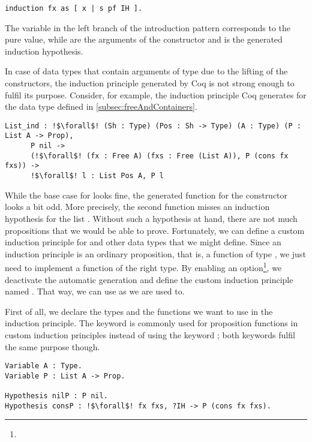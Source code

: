 \begin{verbatim}
induction fx as [ x | s pf IH ].
\end{verbatim}

The variable  in the left branch of the introduction pattern corresponds to the pure value, while   are the arguments of the  constructor and  is the generated induction hypothesis.

In case of data types that contain arguments of type  due to the lifting of the constructors, the induction principle generated by Coq is not strong enough to fulfil its purpose.
Consider, for example, the induction principle Coq generates for the  data type defined in \autoref{subsec:freeAndContainers}.

\begin{verbatim}
List_ind : !$\forall$! (Sh : Type) (Pos : Sh -> Type) (A : Type) (P : List A -> Prop),
      P nil ->
      (!$\forall$! (fx : Free A) (fxs : Free (List A)), P (cons fx fxs)) ->
      !$\forall$! l : List Pos A, P l
\end{verbatim}

While the base case for  looks fine, the generated function for the  constructor looks a bit odd.
More precisely, the second function misses an induction hypothesis for the list .
Without such a hypothesis at hand, there are not much propositions that we would be able to prove.
Fortunately, we can define a custom induction principle for  and other data types that we might define.
Since an induction principle is an ordinary proposition, that is, a function of type , we just need to implement a function of the right type.
By enabling an option\footnote{}, we deactivate the automatic generation and define the custom induction principle named .
That way, we can use  as we are used to.

First of all, we declare the types and the functions we want to use in the induction principle.
The keyword  is commonly used for proposition functions in custom induction principles instead of using the keyword ; both keywords fulfil the same purpose though.

\begin{verbatim}
Variable A : Type.
Variable P : List A -> Prop.

Hypothesis nilP : P nil.
Hypothesis consP : !$\forall$! fx fxs, ?IH -> P (cons fx fxs).
\end{verbatim}

